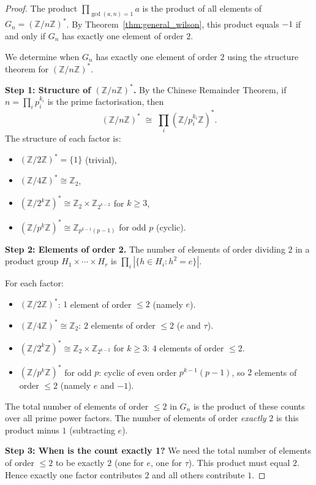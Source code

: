 \documentclass[12pt,a4paper]{amsart}
\theoremstyle{definition}
\newcommand{\Z}{\mathbb{Z}}
\begin{document}
\begin{proof}
  The product $\prod_{\gcd(a,n)=1} a$ is the product of all elements of
  $G_n = (\Z/n\Z)^*$.  By Theorem~\ref{thm:general_wilson}, this product
  equals $-1$ if and only if $G_n$ has exactly one element of order $2$.

  We determine when $G_n$ has exactly one element of order $2$ using the
  structure theorem for $(\Z/n\Z)^*$.

  \textbf{Step 1: Structure of $(\Z/n\Z)^*$.}
  By the Chinese Remainder Theorem, if $n = \prod_{i} p_i^{k_i}$ is the
  prime factorisation, then
  \[
    (\Z/n\Z)^* \;\cong\; \prod_i (\Z/p_i^{k_i}\Z)^*.
  \]
  The structure of each factor is:
  \begin{itemize}
    \item $(\Z/2\Z)^* = \{1\}$ (trivial),
    \item $(\Z/4\Z)^* \cong \Z_2$,
    \item $(\Z/2^k\Z)^* \cong \Z_2 \times \Z_{2^{k-2}}$ for $k \geq 3$,
    \item $(\Z/p^k\Z)^* \cong \Z_{p^{k-1}(p-1)}$ for odd $p$ (cyclic).
  \end{itemize}

  \textbf{Step 2: Elements of order 2.}
  The number of elements of order dividing $2$ in a product group
  $H_1 \times \cdots \times H_r$ is $\prod_i |\{h \in H_i : h^2 = e\}|$.

  For each factor:
  \begin{itemize}
    \item $(\Z/2\Z)^*$: $1$ element of order $\leq 2$ (namely $e$).
    \item $(\Z/4\Z)^* \cong \Z_2$: $2$ elements of order $\leq 2$ ($e$ and $\tau$).
    \item $(\Z/2^k\Z)^* \cong \Z_2 \times \Z_{2^{k-2}}$ for $k \geq 3$:
      $4$ elements of order $\leq 2$.
    \item $(\Z/p^k\Z)^*$ for odd $p$: cyclic of even order $p^{k-1}(p-1)$,
      so $2$ elements of order $\leq 2$ (namely $e$ and $-1$).
  \end{itemize}

  The total number of elements of order $\leq 2$ in $G_n$ is the product
  of these counts over all prime power factors.  The number of elements of
  order \emph{exactly} $2$ is this product minus $1$ (subtracting $e$).

  \textbf{Step 3: When is the count exactly 1?}
  We need the total number of elements of order $\leq 2$ to be exactly $2$
  (one for $e$, one for $\tau$).  This product must equal $2$.
  Hence exactly one factor contributes $2$ and all others contribute $1$.


\end{proof}
\end{document}
